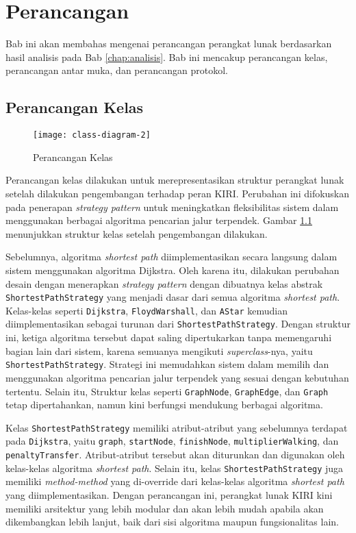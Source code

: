 \chapter{Perancangan}
\label{chap:perancangan}
Bab ini akan membahas mengenai perancangan perangkat lunak berdasarkan hasil analisis pada Bab \ref{chap:analisis}. Bab ini mencakup perancangan kelas, perancangan antar muka, dan perancangan protokol.
\section{Perancangan Kelas}
\label{sec:rancangandiagramkelas}

\begin{figure}[H] 
    \centering  
    \texttt{[image: class-diagram-2]}  
    \caption{Perancangan Kelas}
    \label{fig:rancangandiagramkelas} 
\end{figure}

Perancangan kelas dilakukan untuk merepresentasikan struktur perangkat lunak setelah dilakukan pengembangan terhadap peran KIRI. Perubahan ini difokuskan pada penerapan \textit{strategy pattern} untuk meningkatkan fleksibilitas sistem dalam menggunakan berbagai algoritma pencarian jalur terpendek. Gambar \ref{fig:rancangandiagramkelas} menunjukkan struktur kelas setelah pengembangan dilakukan.

Sebelumnya, algoritma \textit{shortest path} diimplementasikan secara langsung dalam sistem menggunakan algoritma Dijkstra. Oleh karena itu, dilakukan perubahan desain dengan menerapkan \textit{strategy pattern} dengan dibuatnya kelas abstrak \texttt{ShortestPathStrategy} yang menjadi dasar dari semua algoritma \textit{shortest path}. Kelas-kelas seperti \texttt{Dijkstra}, \texttt{FloydWarshall}, dan \texttt{AStar} kemudian diimplementasikan sebagai turunan dari \texttt{ShortestPathStrategy}. Dengan struktur ini, ketiga algoritma tersebut dapat saling dipertukarkan tanpa memengaruhi bagian lain dari sistem, karena semuanya mengikuti \textit{superclass}-nya, yaitu \texttt{ShortestPathStrategy}. Strategi ini memudahkan sistem dalam memilih dan menggunakan algoritma pencarian jalur terpendek yang sesuai dengan kebutuhan tertentu. Selain itu, Struktur kelas seperti \texttt{GraphNode}, \texttt{GraphEdge}, dan \texttt{Graph} tetap dipertahankan, namun kini berfungsi mendukung berbagai algoritma.

Kelas \texttt{ShortestPathStrategy} memiliki atribut-atribut yang sebelumnya terdapat pada \texttt{Dijkstra}, yaitu \texttt{graph}, \texttt{startNode}, \texttt{finishNode}, \texttt{multiplierWalking}, dan \texttt{penaltyTransfer}. Atribut-atribut tersebut akan diturunkan dan digunakan oleh kelas-kelas algoritma \textit{shortest path}. Selain itu, kelas \texttt{ShortestPathStrategy} juga memiliki \textit{method-method} yang di-override dari kelas-kelas algoritma \textit{shortest path} yang diimplementasikan. Dengan perancangan ini, perangkat lunak KIRI kini memiliki arsitektur yang lebih modular dan akan lebih mudah apabila akan dikembangkan lebih lanjut, baik dari sisi algoritma maupun fungsionalitas lain.


